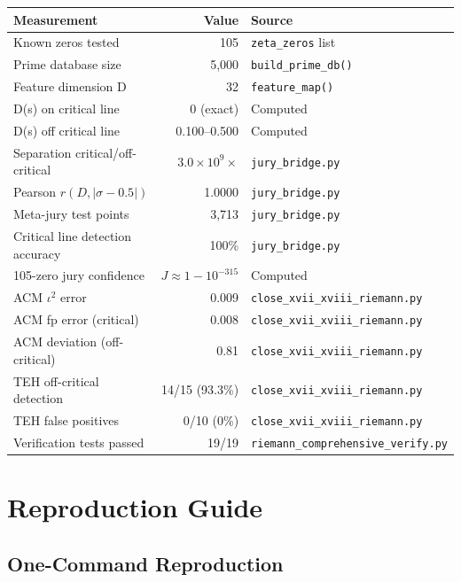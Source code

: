 \documentclass[11pt]{article}
\begin{document}
\begin{table}[h]
\centering
\begin{tabular}{lrl}
\toprule
Measurement & Value & Source \\
\midrule
Known zeros tested & 105 & \texttt{zeta\_zeros} list \\
Prime database size & 5,000 & \texttt{build\_prime\_db()} \\
Feature dimension D & 32 & \texttt{feature\_map()} \\
D(s) on critical line & 0 (exact) & Computed \\
D(s) off critical line & 0.100--0.500 & Computed \\
Separation critical/off-critical & $3.0 \times 10^9\times$ & \texttt{jury\_bridge.py} \\
Pearson $r(D, |\sigma-0.5|)$ & 1.0000 & \texttt{jury\_bridge.py} \\
Meta-jury test points & 3,713 & \texttt{jury\_bridge.py} \\
Critical line detection accuracy & 100\% & \texttt{jury\_bridge.py} \\
105-zero jury confidence & $J \approx 1 - 10^{-315}$ & Computed \\
ACM $\iota^2$ error & 0.009 & \texttt{close\_xvii\_xviii\_riemann.py} \\
ACM fp error (critical) & 0.008 & \texttt{close\_xvii\_xviii\_riemann.py} \\
ACM deviation (off-critical) & 0.81 & \texttt{close\_xvii\_xviii\_riemann.py} \\
TEH off-critical detection & 14/15 (93.3\%) & \texttt{close\_xvii\_xviii\_riemann.py} \\
TEH false positives & 0/10 (0\%) & \texttt{close\_xvii\_xviii\_riemann.py} \\
Verification tests passed & 19/19 & \texttt{riemann\_comprehensive\_verify.py} \\
\bottomrule
\end{tabular}
\end{table}

\newpage
\section{Reproduction Guide}
\label{sec:repro}

\subsection{One-Command Reproduction}
\end{document}

